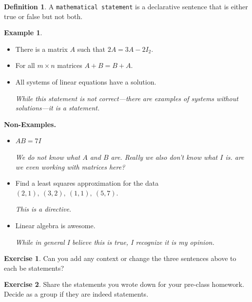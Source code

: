 \documentclass[handout]{beamer}
\newcommand{\fn}{\insertframenumber}
\theoremstyle{definition}
\newtheorem{exercise}{Exercise}
\newtheorem*{defn}{Definition}
\newtheorem*{exa}{Example}
\renewcommand{\emph}[1]{{\color{blue}\texttt{#1}}}
\begin{document}
\begin{frame}{\fn}
	\begin{defn}
		A \emph{mathematical statement} is a declarative sentence that is either true or false but not both.
	\end{defn}
	\begin{exa}
		\begin{itemize}[label=--]
			\item There is a matrix $A$ such that $2A=3A-2I_2$.
			\item For all $m\times n$ matrices $A+B=B+A$.
			\item All systems of linear equations have a solution.
			
			\textit{While this statement is not correct---there are examples of systems without solutions---it is a statement.}
		\end{itemize}
	\end{exa}
\end{frame}
\begin{frame}{\fn}
	\begin{block}{\textbf{Non-Examples.}}
		\begin{itemize}[label=--]
			\item $AB=7I$ 
			
			\textit{We do not know what $A$ and $B$ are. Really we also don't know what $I$ is. are we even working with matrices here?}
			\item Find a least squares approximation for the data $(2,1),\ (3,2),\ (1,1),\ (5,7)$.
			
			\textit{This is a directive.}
			\item Linear algebra is awesome.  
			
			\textit{While in general I believe this is true, I recognize it is my opinion.}
		\end{itemize}
	\end{block}
	\begin{exercise}
		Can you add any context or change the three sentences above to each be statements?
	\end{exercise}
\end{frame}
\begin{frame}{\fn}
	\begin{exercise}
		Share the statements you wrote down for your pre-class homework.  
		Decide as a group if they are indeed statements.
	\end{exercise}
\end{frame}
\end{document}
